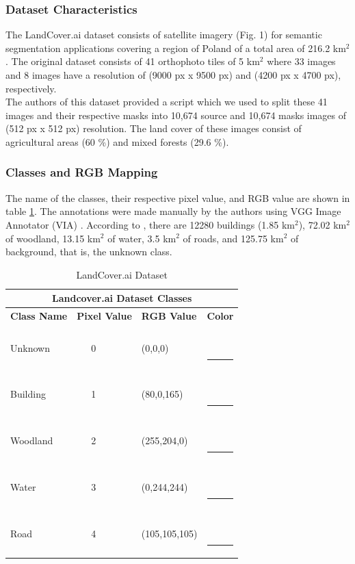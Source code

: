 \documentclass[conference]{IEEEtran}
\begin{document}
\subsubsection{Dataset Characteristics}
The LandCover.ai dataset consists of satellite imagery (Fig. 1) for semantic segmentation applications covering a region of Poland of a total area of 216.2 km$^2$  \cite{DBLP:journals/corr/abs-2005-02264}. The original dataset consists of 41 orthophoto tiles of 5 km$^2$ where 33 images and 8 images have a resolution of (9000 px x 9500 px) and (4200 px x 4700 px), respectively. \\ \indent
The authors of this dataset \cite{DBLP:journals/corr/abs-2005-02264} provided a script which we used to split these 41 images and their respective masks into 10,674 source and 10,674 masks images of (512 px x 512 px) resolution. The land cover of these images consist of agricultural areas (60 \%) and mixed forests (29.6 \%). \\ \indent



\subsubsection{Classes and RGB Mapping}
The name of the classes, their respective pixel value, and RGB value are shown in table \ref{landcover_ai_classes}. The annotations were made manually by the authors using VGG  Image Annotator (VIA) \cite{dutta2019vgg}. According to \cite{DBLP:journals/corr/abs-2005-02264}, there are 12280 buildings (1.85 km$^2$), 72.02 km$^2$ of woodland, 13.15 km$^2$ of water, 3.5 km$^2$ of roads, and 125.75 km$^2$ of background, that is, the unknown class. \\

\begin{table}[htbp]
\centering
\caption{LandCover.ai Dataset}
\begin{tabular}{|p{1.2cm}|p{0.7cm}|p{1.6cm}|p{0.7cm}|}
 \hline
 \multicolumn{4}{|c|}{\textbf{Landcover.ai Dataset Classes}} \\
 \hline
 \textbf{Class Name} & \textbf{Pixel Value}& \textbf{RGB Value}& \textbf{Color} \\
 \hline
 Unknown &  \ \ \ 0  & (0,0,0) &   \textcolor{black}{\ \ \ \rule{0.2cm}{0.2cm}} \\ 
 \hline
 Building & \ \ \ 1  & (80,0,165) & \textcolor{purple}{\ \ \ \rule{0.2cm}{0.2cm}}\\ 
 \hline
 Woodland & \ \ \ 2  & (255,204,0) &  \textcolor{yellow}{\ \ \ \rule{0.2cm}{0.2cm}}\\ 
 \hline
 Water & \ \ \ 3  & (0,244,244) & \textcolor{cyan}{\ \ \ \rule{0.2cm}{0.2cm}} \\
 \hline
 Road & \ \ \ 4  & (105,105,105) &  \textcolor{gray}{\ \ \ \rule{0.2cm}{0.2cm}} \\
 \hline
\end{tabular}
\label{landcover_ai_classes}
\end{table}
\\
\end{document}
